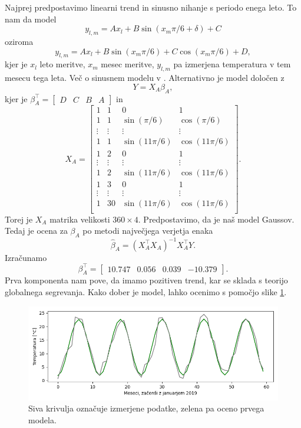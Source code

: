 \documentclass[12pt, a4paper]{article}
\begin{document}
Najprej predpostavimo linearni trend in sinusno nihanje s periodo 
enega leto. To nam da model
\[
    y_{l,m} = Ax_l + B\sin(x_m\pi/6 + \delta) + C
\]
oziroma
\[
    y_{l,m} = Ax_l + B\sin(x_m\pi/6) + C\cos(x_m\pi/6) + D,
\]
kjer je $x_l$ leto meritve, $x_m$ mesec meritve, $y_{l,m}$ pa 
izmerjena temperatura v tem mesecu tega leta. Več o sinusnem 
modelu v \cite{wiki:Sinusoidal_model}. Alternativno je model 
določen z
\[
    Y = X_A\beta_A,
\]
kjer je $\beta_A^\top = \begin{bmatrix}
    D & C & B & A
\end{bmatrix}$ in
\[
    X_A = \begin{bmatrix}
        1 & 1 & 0 & 1 \\
        1 & 1 & \sin\left(\pi/6\right) & \cos\left(\pi/6\right) \\
        \vdots & \vdots & \vdots & \vdots \\
        1 & 1 &  \sin\left(11\pi/6\right) & \cos\left(11\pi/6\right) \\
        1 & 2 & 0 & 1 \\
        \vdots & \vdots & \vdots & \vdots \\
        1 & 2 &  \sin\left(11\pi/6\right) & \cos\left(11\pi/6\right) \\
        1 & 3 &  0 & 1 \\
        \vdots & \vdots & \vdots & \vdots \\
        1 & 30 & \sin\left(11\pi/6\right) & \cos\left(11\pi/6\right)\\
        \end{bmatrix}.
\]
Torej je $X_A$ matrika velikosti $360 \times 4$. Predpostavimo, da je 
naš model Gaussov. Tedaj je ocena za $\beta_A$ po metodi največjega 
verjetja enaka
\[
    \hat \beta_A = (X_A^\top X_A)^{-1} X_A^\top Y.
\]
Izračunamo
\[
    \beta_A^\top = \begin{bmatrix}
        10.747 & 0.056 & 0.039 & -10.379
    \end{bmatrix}.
\]
Prva komponenta nam pove, da imamo pozitiven trend, kar se sklada 
s teorijo globalnega segrevanja. Kako dober je model, lahko ocenimo s pomočjo slike 
\ref{png:prvi}.
\begin{figure}[H]
    \centering
    \includegraphics[width=14cm]{Slike/prvi_model.png}
    \caption{Siva krivulja označuje izmerjene podatke, zelena pa oceno 
    prvega modela.}
    \label{png:prvi}
\end{figure}
\end{document}
